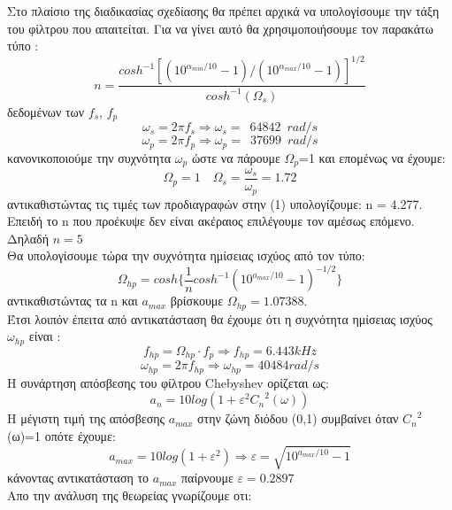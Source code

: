 \documentclass{article}
\begin{document}
Στο πλαίσιο της διαδικασίας σχεδίασης θα πρέπει αρχικά να υπολογίσουμε την τάξη του φίλτρου που απαιτείται. Για να γίνει αυτό θα χρησιμοποιήσουμε τον παρακάτω τύπο :
\begin{equation}
\boxed{n=\frac{cosh^{-1}[(10^{{α_{min}}/{10}}-1)/ (10^{{α_{max}}/{10}}-1)]^{1/2}}{cosh^{-1}(Ω_s)}
}
\end{equation}
δεδομένων των $f_s$, $f_p$
\begin{equation*}
ω_s = 2πf_s \Rightarrow \boxed{ω_s =\enspace 64842 \enspace rad/s}
\end{equation*}
\begin{equation*}
ω_p = 2πf_p \Rightarrow \boxed{ω_p =\enspace 37699 \enspace rad/s}   
\end{equation*}
κανονικοποιούμε την συχνότητα $ω_p$ ώστε να πάρουμε $Ω_p$=1 και επομένως να έχουμε:
\begin{equation*}
\boxed{Ω_p = 1} \enspace \enspace \boxed{Ω_s = \frac{ω_s}{ω_p} = 1.72}
\end{equation*}
αντικαθιστώντας τις τιμές των προδιαγραφών στην (1) υπολογίζουμε: n = 4.277. Επειδή το n που προέκυψε δεν είναι ακέραιος επιλέγουμε τον αμέσως επόμενο. Δηλαδή $\boxed{n=5}$ \\[0.4\baselineskip]
Θα υπολογίσουμε τώρα την συχνότητα ημίσειας ισχύος από τον τύπο:
\begin{equation*}
\boxed{
Ω_{hp} = cosh\{\frac{1}{n}cosh^{-1}(10^{a_{max}/10} -1)^{-1/2}\} }
\end{equation*} 
αντικαθιστώντας τα n και $a_{max}$ βρίσκουμε $\boxed{Ω_{hp}=1.07388}$. \\
Έτσι λοιπόν έπειτα από αντικατάσταση θα έχουμε ότι η συχνότητα ημίσειας ισχύος $ω_{hp}$ είναι :
\begin{equation*}
f_{hp} = Ω_{hp} \cdot f_p \Rightarrow
\boxed{f_{hp} = 6.443 kHz}
\end{equation*}
\begin{equation*}
ω_{hp} = 2πf_{hp} \Rightarrow \boxed{ω_{hp} = 40484rad/s} 
\end{equation*}
H συνάρτηση απόσβεσης του φίλτρου Chebyshev ορίζεται ως:
\begin{equation*}
a_n = 10log(1+ε^2 {C_n}^2(ω))
\end{equation*}
Η μέγιστη τιμή της απόσβεσης $a_{max}$ στην ζώνη διόδου (0,1) συμβαίνει όταν ${C_n}^2$(ω)=1 οπότε έχουμε:
\begin{equation*}
a_{max} = 10log(1+ε^2) \Rightarrow \boxed{ε = \sqrt{10^{a_{max}/10} -1}}
\end{equation*}
κάνοντας αντικατάσταση το $a_{max}$ παίρνουμε $\boxed{ε = 0.2897}$\\ Απο την ανάλυση της θεωρείας γνωρίζουμε οτι: 
\end{document}
